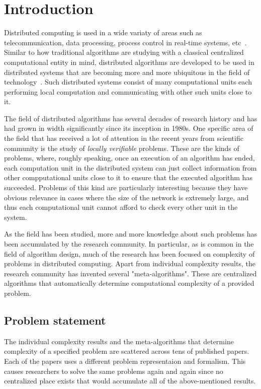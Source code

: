 \chapter{Introduction}
\label{chapter:intro}

Distributed computing is used in a wide variaty of areas
such as telecommunication, data processing, process control in real-time systems, etc~\cite{Lynch1996}. Similar to
how traditional algorithms are studying with a classical
centralized computational entity in mind, distributed
algorithms are developed to be used in distributed
systems that are becoming more and more ubiquitous in the
field of technology~\cite{Attiya2004}. Such distributed
systems consist of many computational units each
performing local computation and communicating
with other such units close to it.

The field of distributed algorithms has several
decades of research history and has had grown
in width significantly since its inception in 1980s.
One specific
area of the field that has received a lot of
attention in the recent years from scientific
community is the study of \emph{locally verifiable}
problems.
These are the kinds of problems, where, roughly speaking,
once an execution of an algorithm has ended, each
computation unit in the distributed system can just
collect information from other compputational units
close to it to ensure that the executed algorithm has succeeded. Problems of this kind are particularly
interesting because they have obvious relevance
in cases where the size of the network is extremely
large, and thus each computational unit
cannot afford to check every other unit in the system.

As the field has been studied, more and more knowledge
about such problems has been accumulated by the
research community. In particular, as is common
in the field of algorithm design, much of the
research has been focused on complexity of
problems in distributed computing. Apart from
individual complexity results, the research
community has invented several "meta-algorithms".
These are centralized algorithms that
automatically determine
computational complexity of a provided
problem.

\section{Problem statement}

The individual complexity results and the meta-algorithms
that determine complexity of a specified problem are
scattered across tens of published papers. Each of the
papers uses a different problem representaion and
formalism. This causes researchers to solve
the same problems again and again since no
centralized place exists that would accumulate all of the
above-mentioned results.

